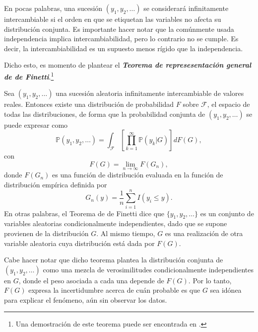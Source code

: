 En pocas palabras, una sucesi\'on $(y_1,y_2,\ldots)$ se considerar\'a infinitamente intercambiable si el orden en que se etiquetan las variables no afecta su distribuci\'on conjunta. Es importante hacer notar que la com\'unmente usada independencia implica intercambiabilidad, pero lo contrario no se cumple. Es decir, la intercambiabilidad es un supuesto menos r\'igido que la independencia.

Dicho esto, es momento de plantear el \textbf{\textit{Teorema de represesentaci\'on general de de Finetti}}.\footnote{Una demostraci\'on de este teorema puede ser encontrada en \cite{Schervish_TheoryStats}.}

\begin{theorem*}
    Sea $(y_1,y_2,\ldots)$ una sucesi\'on aleatoria infinitamente intercambiable de valores reales. Entonces existe una distribuci\'on de probabilidad $F$ sobre $\mathcal{F}$, el espacio de todas las distribuciones, de forma que la probabilidad conjunta de $(y_1,y_2,\ldots)$ se puede expresar como
    \begin{equation*}
        \mathbb{P}(y_1,y_2,\ldots) =
        \int_{\mathcal{F}}\left[\prod_{k=1}^\infty \mathbb{P}(y_k|G)\right]dF(G),
    \end{equation*}
    con
    \begin{equation*}
        F(G) = \lim_{n \to \infty} F(G_n),
    \end{equation*}
    donde $F(G_n)$ es una funci\'on de distribuci\'on evaluada en la funci\'on de distribuci\'on emp\'irica definida por
    \begin{equation*}
        G_n(y) = \frac{1}{n} \sum_{i=1}^n I(y_i \leq y).
    \end{equation*}
    En otras palabras, el Teorema de de Finetti dice que $\{y_1,y_2,\ldots\}$ es un conjunto de variables aleatorias condicionalmente independientes, dado que se supone provienen de la distribuci\'on $G$. Al mismo tiempo, $G$ es una realizaci\'on de otra variable aleatoria cuya distribuci\'on est\'a dada por $F(G)$.
\end{theorem*}

Cabe hacer notar que dicho teorema plantea la distribuci\'on conjunta de $(y_1,y_2,\ldots)$ como una mezcla de verosimilitudes condicionalmente independientes en $G$, donde el peso asociada a cada una depende de $F(G)$. Por lo tanto, $F(G)$ expresa la incertidumbre acerca de cu\'an probable es que $G$ sea id\'onea para explicar el fen\'omeno, a\'un sin observar los datos.

